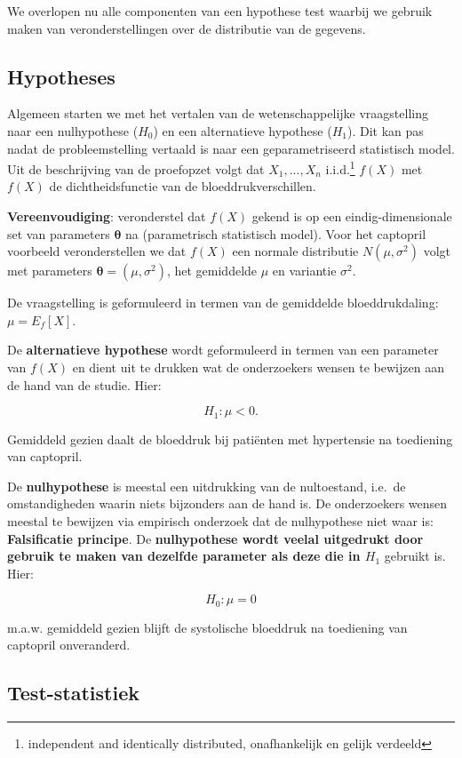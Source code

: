 \documentclass[
  12pt,dutch,coursenotes]{book}
\theoremstyle{definition}
\theoremstyle{definition}
\theoremstyle{definition}
\theoremstyle{definition}
\theoremstyle{remark}
\begin{document}
We overlopen nu alle componenten van een hypothese test waarbij we gebruik maken van veronderstellingen over de distributie van de gegevens.

\hypertarget{hypotheses}{%
\subsection{Hypotheses}\label{hypotheses}}

Algemeen starten we met het vertalen van de wetenschappelijke vraagstelling naar een nulhypothese (\(H_0\)) en een alternatieve hypothese (\(H_1\)).
Dit kan pas nadat de probleemstelling vertaald is naar een geparametriseerd statistisch model.
Uit de beschrijving van de proefopzet volgt dat \(X_1,...,X_n\) i.i.d.\footnote{independent and identically distributed, onafhankelijk en gelijk verdeeld} \(f(X)\)
met \(f(X)\) de dichtheidsfunctie van de bloeddrukverschillen.

\textbf{Vereenvoudiging}: veronderstel dat \(f(X)\) gekend is op een eindig-dimensionale set van parameters \(\mathbf{\theta}\) na (parametrisch statistisch model).
Voor het captopril voorbeeld veronderstellen we dat \(f(X)\) een normale distributie \(N(\mu,\sigma^2)\) volgt met parameters \(\mathbf{\theta}=(\mu,\sigma^2)\), het gemiddelde \(\mu\) en variantie \(\sigma^2\).

De vraagstelling is geformuleerd in termen van de gemiddelde bloeddrukdaling: \(\mu=E_f[X]\).

De \textbf{alternatieve hypothese} wordt geformuleerd in termen van een parameter van \(f(X)\) en dient uit te drukken wat de onderzoekers wensen te bewijzen aan de hand van de studie.
Hier:

\[H_1: \mu<0.\]

Gemiddeld gezien daalt de bloeddruk bij patiënten met hypertensie na toediening van captopril.

De \textbf{nulhypothese} is meestal een uitdrukking van de nultoestand, i.e.~de omstandigheden waarin niets bijzonders aan de hand is.
De onderzoekers wensen meestal te bewijzen via empirisch onderzoek dat de nulhypothese niet waar is:
\textbf{Falsificatie principe}.
De \textbf{nulhypothese wordt veelal uitgedrukt door gebruik te maken van dezelfde parameter als deze die in \(H_1\)} gebruikt is. Hier:

\[H_0 : \mu=0\]

m.a.w. gemiddeld gezien blijft de systolische bloeddruk na toediening van captopril onveranderd.

\hypertarget{test-statistiek}{%
\subsection{Test-statistiek}\label{test-statistiek}}
\end{document}
